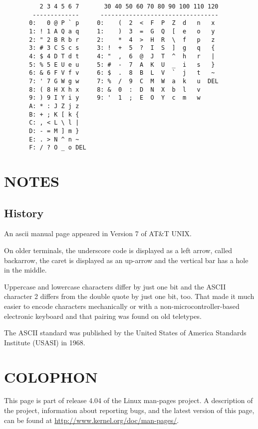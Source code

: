 \begin{verbatim}
          2 3 4 5 6 7       30 40 50 60 70 80 90 100 110 120
        -------------      ---------------------------------
       0:   0 @ P ` p     0:    (  2  <  F  P  Z  d   n   x
       1: ! 1 A Q a q     1:    )  3  =  G  Q  [  e   o   y
       2: " 2 B R b r     2:    *  4  >  H  R  \  f   p   z
       3: # 3 C S c s     3: !  +  5  ?  I  S  ]  g   q   {
       4: $ 4 D T d t     4: "  ,  6  @  J  T  ^  h   r   |
       5: % 5 E U e u     5: #  -  7  A  K  U  _  i   s   }
       6: & 6 F V f v     6: $  .  8  B  L  V  `  j   t   ~
       7: ' 7 G W g w     7: %  /  9  C  M  W  a  k   u  DEL
       8: ( 8 H X h x     8: &  0  :  D  N  X  b  l   v
       9: ) 9 I Y i y     9: '  1  ;  E  O  Y  c  m   w
       A: * : J Z j z
       B: + ; K [ k {
       C: , < L \ l |
       D: - = M ] m }
       E: . > N ^ n ~
       F: / ? O _ o DEL
\end{verbatim}

\section{NOTES}
\subsection{History}

       An ascii manual page appeared in Version 7 of AT\&T UNIX.

       On older terminals, the underscore code is displayed as a  left  arrow,
       called  backarrow, the caret is displayed as an up-arrow and the
vertical bar has a hole in the middle.

       Uppercase and lowercase characters differ by just one bit and the ASCII
       character  2  differs from the double quote by just one bit, too.  That
       made it much easier to encode characters mechanically or  with  a
non-microcontroller-based electronic keyboard and that pairing was found on
       old teletypes.

       The ASCII standard was published by the United States of America
Standards Institute (USASI) in 1968.

\section{COLOPHON}

       This page is part of release 4.04 of the Linux  man-pages  project.   A
       description  of  the project, information about reporting bugs, and the
       latest    version    of    this    page,    can     be     found     at
       \url{http://www.kernel.org/doc/man-pages/}.